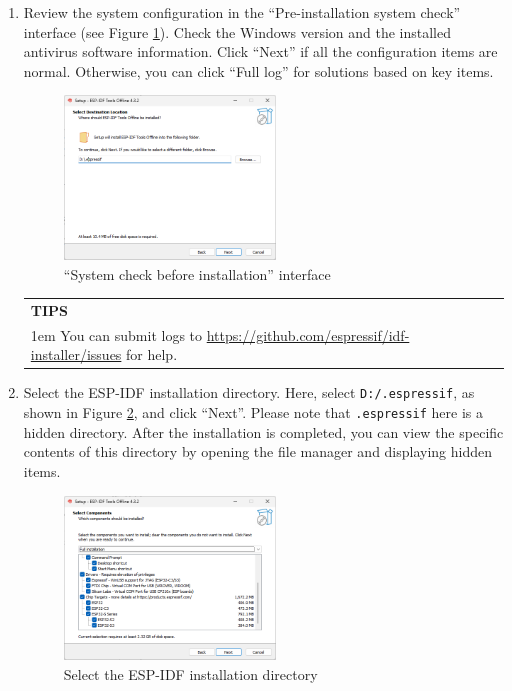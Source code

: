 \documentclass[a4paper,12pt,openany]{book}
\newcommand{\secnote}[2][NOTE]{ %
\vspace{6pt}
\begin{tabular}{b{0.93\textwidth}}
\hline
\fontfamily{phv}\selectfont \textbf{#1}\\
\leftskip 1em #2\\
\hline
\end{tabular}
}
\begin{document}
\begin{enumerate}[label=(\arabic*)]
    \item Review the system configuration in the “Pre-installation system check” interface (see Figure \ref{“System check before installation” interface}). Check the Windows version and the installed antivirus software information. Click “Next” if all the configuration items are normal. Otherwise, you can click “Full log” for solutions based on key items.

    \begin{figure}[h!]
        \centering
        \includegraphics[width=0.53\textwidth]{D4Z/4-7}
        \caption{“System check before installation” interface}
        \label{“System check before installation” interface}
    \end{figure}

    \secnote[TIPS]{You can submit logs to \url{https://github.com/espressif/idf-installer/issues} for help.}

    \item Select the ESP-IDF installation directory. Here, select \verb|D:/.espressif|, as shown in Figure \ref{Select the ESP-IDF installation directory}, and click “Next”. Please note that \verb|.espressif| here is a hidden directory. After the installation is completed, you can view the specific contents of this directory by opening the file manager and displaying hidden items.

    \begin{figure}[h!]
        \centering
        \includegraphics[width=0.53\textwidth]{D4Z/4-8}
        \caption{Select the ESP-IDF installation directory}
        \label{Select the ESP-IDF installation directory}
    \end{figure}


\end{enumerate}
\end{document}

